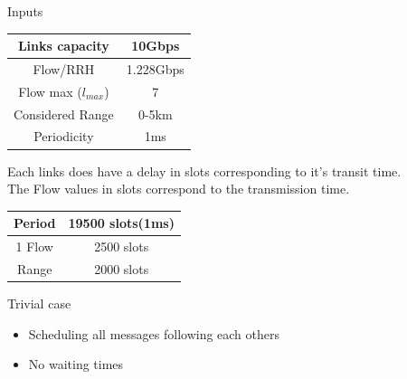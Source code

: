 \documentclass{beamer}
\begin{document}
\begin{frame}{Inputs}


  \begin{tabular}{|c|c|}
  \hline
   Links capacity & 10Gbps \\
   \hline
   Flow/RRH & 1.228Gbps \\
   \hline
   Flow max ($l_{max}$) & 7 \\
   \hline
   Considered Range & 0-5km \\
   \hline
   Periodicity & 1ms \\
   \hline
   \end{tabular}
   
   Each links does have a delay in slots corresponding to it's transit time.\\

  The Flow values in slots correspond to the transmission time.\\

   \begin{tabular}{|c|c|}
   \hline
   Period & 19500 slots(1ms) \\
   \hline
   1 Flow & 2500 slots\\
   \hline
   Range & 2000 slots\\
   \hline
  \end{tabular}

  
  
\end{frame}


\begin{frame}{Trivial case}
\centering
{}

  \begin{itemize}
  \item Scheduling all messages following each others
  \item No waiting times
  \end{itemize}
\end{frame}
\end{document}
